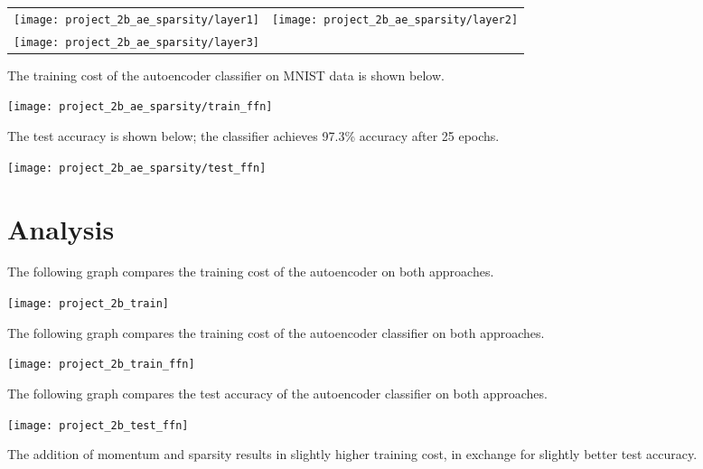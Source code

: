 \begin{longtabu}{X[c]X[c]}
    \texttt{[image: project\_2b\_ae\_sparsity/layer1]} &
    \texttt{[image: project\_2b\_ae\_sparsity/layer2]} \\
    \texttt{[image: project\_2b\_ae\_sparsity/layer3]}
\end{longtabu}

The training cost of the autoencoder classifier on MNIST data is shown below.

\begin{center}
    \texttt{[image: project\_2b\_ae\_sparsity/train\_ffn]}
\end{center}

The test accuracy is shown below; the classifier achieves 97.3\% accuracy
after 25 epochs.

\begin{center}
    \texttt{[image: project\_2b\_ae\_sparsity/test\_ffn]}
\end{center}

\section*{Analysis}

The following graph compares the training cost of the autoencoder on both
approaches.

\begin{center}
    \texttt{[image: project\_2b\_train]}
\end{center}

The following graph compares the training cost of the autoencoder classifier
on both approaches.

\begin{center}
    \texttt{[image: project\_2b\_train\_ffn]}
\end{center}

The following graph compares the test accuracy of the autoencoder classifier
on both approaches.

\begin{center}
    \texttt{[image: project\_2b\_test\_ffn]}
\end{center}

The addition of momentum and sparsity results in slightly higher training cost, in
exchange for slightly better test accuracy.